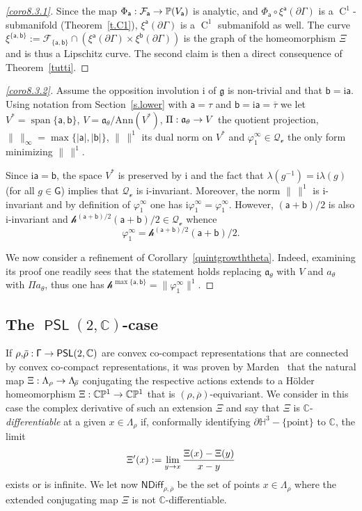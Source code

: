 \documentclass[AHL,Unicode,longabstracts,MathTools]{cedram}
\DeclareMathOperator{\spa}{span}
\DeclareMathOperator{\class}{C}
\newcommand{\ii}{\mathrm{i}}
\newcommand{\Ann}{\mathrm{Ann}}
\newcommand{\cartan}{a}
\newcommand{\Ndiff}{{\mathsf{NDiff}}}
\DeclareMathOperator{\PSL}{{\mathsf{PSL}}}
\newcommand{\scr}{\mathscr}
\newcommand{\hC}[1]{{\scr h}^{#1}}
\newcommand{\cc}{\scr{v}}
\renewcommand{\sf}[1]{{\mathsf{#1}}}
\newcommand{\sroot}{{\sf{a}}}
\newcommand{\bb}{{\sf{b}}}
\newcommand{\sfG}{\sf{G}}
\newcommand{\G}{\sf{\Gamma}}
\newcommand{\calF}{\mathcal{F}}
\newcommand{\calQ}{\mathcal{Q}}
\newcommand{\C}{\mathbb{C}}
\renewcommand{\P}{\mathbb{P}}
\renewcommand{\H}{\mathbb{H}}
\renewcommand{\t}{\theta}
\newcommand{\bord}{\partial}
\newcommand{\slroot}{{\tau}}
\newcommand{\ov}{\overline}
\newcommand{\ovrho}{\overline{\!\rho}}
\renewcommand{\/}{\backslash}
\newcommand{\<}{\langle}
\renewcommand{\>}{\rangle}
\renewcommand{\ge}{\mathfrak{g}}
\renewcommand{\a}{\mathfrak{a}}
\renewcommand*{\to}{\mathchoice{\longrightarrow}{\rightarrow}{\rightarrow}{\rightarrow}}
\begin{document}
\begin{proofc}
\begin{proof}[{\eqref{coro8.3.1}}]
Since the map $\Phi_\sroot:\calF_{\sroot}\to\P(V_{\sroot})$ is analytic, and $\Phi_\sroot\circ\xi^\sroot(\bord\G)$ is a $\class^1$-submanifold (Theorem~\ref{t.C1}), $\xi^\sroot(\bord\G)$ is a $\class^1$ submanifold as well. The curve $\xi^{\{\sroot,\bb\}}:=\calF_{\{\sroot,\bb\}}\cap (\xi^{\sroot}(\bord\G)\times\xi^{\bb}(\bord\G))$ is the graph of the homeomorphism $\Xi$ and is thus a Lipschitz curve. The second claim is then a direct consequence of Theorem~\ref{tutti}.\let\qed\relax
\end{proof}

\begin{proof}[{\eqref{coro8.3.2}}]
Assume the opposition involution $\ii$ of $\ge$ is non-trivial and that $\bb=\ii\sroot$. Using notation from Section~\ref{s.lower} with $\sroot=\slroot$ and $\bb=\ii\sroot=\ov{\slroot}$ we let $V^*=\spa\{\sroot,\bb\}$, $V=\a_\t/\Ann(V^*)$, $\Pi:\a_\t\to V$ the quotient projection, $\|\,\|_\infty=\max\{|\sroot|,|\bb|\}$, $\|\,\|^1$ its dual norm on $V^*$ and ${\varphi^\infty_1}\in\calQ_\cc$ the only form minimizing $\|\,\|^1$.

Since $\ii\sroot=\bb$, the space $V^*$ is preserved by $\ii$ and the fact that $\lambda(g^{-1})=\ii\lambda(g)$ (for all $g\in \sfG$) implies that $\calQ_\cc$ is $\ii$-invariant. Moreover, the norm $\|\,\|^1$ is $\ii$-invariant and by definition of ${\varphi^\infty_1}$ one has $\ii{\varphi^\infty_1}={\varphi^\infty_1}$. However, $(\sroot+\bb)/2$ is also $\ii$-invariant and $\hC{(\sroot+\bb)/2}(\sroot+\bb)/2\in\calQ_\cc$ whence
\[
{\varphi^\infty_1}=\hC{(\sroot+\bb)/2}(\sroot+\bb)/2.
\]


We now consider a refinement of Corollary~\ref{quintgrowththeta}. Indeed, examining its proof one readily sees that the statement holds replacing $\a_\t$ with $V$ and $\cartan_\t$ with $\Pi\cartan_\t$, thus one has $\hC{\max\{\sroot,\bb\}}=\|{\varphi^\infty_1}\|^1$.
\end{proof}
\let\qed\relax
\end{proofc}

\subsection{The \texorpdfstring{$\PSL(2,\C)$}{PSL(2, C)}-case}\label{klein}

If $\rho,\ovrho:\G\to\PSL(2,\C)$ are convex co-compact representations that are connected by convex co-compact representations, it was proven by Marden~\cite{Marden} that the natural map $\Xi:\Lambda_\rho\to\Lambda_{\ovrho}$ conjugating the respective actions extends to a H\"older homeomorphism $\Xi:\C\P^1\to\C\P^1$ that is $(\rho,\ovrho)$-equivariant. We consider in this case the complex derivative of such an extension $\Xi$ and say that $\Xi$ is $\C$-\emph{differentiable} at a given $x\in\Lambda_\rho$ if, conformally identifying $\bord\H^3-\{\text{point}\}$ to $\C$, the limit
\[
\Xi'(x):=\lim_{y\to x} \frac{\Xi(x)-\Xi(y)}{x-y}
\]
exists or is infinite. We let now $\Ndiff_{\rho,\ovrho}$ be the set of points $x\in\Lambda_\rho$ where the extended conjugating map $\Xi$ is not $\C$-differentiable.
\end{document}

